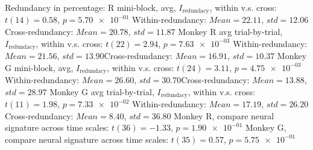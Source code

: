 Redundancy in percentage: \nMonkey R mini-block, avg, $I_\textrm{redundacy}$, within v.s. cross: $t(14) = 0.58$, $p = \num{5.70e-01}$ 
Within-redundancy: $Mean = 22.11$, $std = 12.06$Cross-redundancy: $Mean = 20.78$, $std = 11.87$ 
Monkey R avg trial-by-trial, $I_\textrm{redundacy}$, within v.s. cross: $t(22) = 2.94$, $p = \num{7.63e-03}$ 
Within-redundancy: $Mean = 21.56$, $std = 13.90$Cross-redundancy: $Mean = 16.91$, $std = 10.37$ 
Monkey G mini-block, avg, $I_\textrm{redundacy}$, within v.s. cross: $t(24) = 3.11$, $p = \num{4.75e-03}$ 
Within-redundancy: $Mean = 26.60$, $std = 30.70$Cross-redundancy: $Mean = 13.88$, $std = 28.97$ 
Monkey G avg trial-by-trial, $I_\textrm{redundacy}$, within v.s. cross: $t(11) = 1.98$, $p = \num{7.33e-02}$ 
Within-redundancy: $Mean = 17.19$, $std = 26.20$Cross-redundancy: $Mean = 8.40$, $std = 36.80$ 
Monkey R, compare neural signature across time scales: $t(36) = -1.33$, $p = \num{1.90e-01}$ 
Monkey G, compare neural signature across time scales: $t(35) = 0.57$, $p = \num{5.75e-01}$ 
